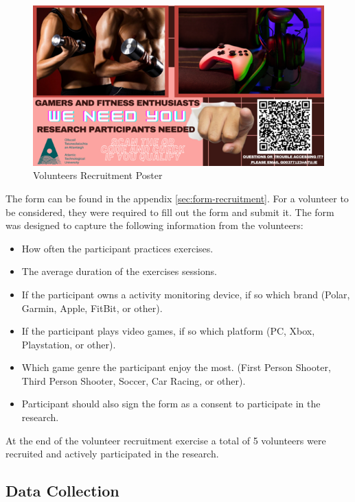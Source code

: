 \begin{figure}[ht]
    \centering
    \includegraphics[width=0.95\linewidth]{images/poster.png}
    \caption{Volunteers Recruitment Poster}
    \label{fig:recruitment-poster}
\end{figure}

The form can be found in the appendix \ref{sec:form-recruitment}.
For a volunteer to be considered, they were required to fill out the form and submit it. The form was designed to capture the following information from the volunteers:

\begin{itemize}
    \item How often the participant practices exercises.
    \item The average duration of the exercises sessions.
    \item If the participant owns a activity monitoring device, if so which brand (Polar, Garmin, Apple, FitBit, or other).
    \item If the participant plays video games, if so which platform (PC, Xbox, Playstation, or other).
    \item Which game genre the participant enjoy the most. (First Person Shooter, Third Person Shooter, Soccer, Car Racing, or other).
    \item Participant should also sign the form as a consent to participate in the research.
\end{itemize}

At the end of the volunteer recruitment exercise a total of 5 volunteers were recruited and actively participated in the research. 

\subsection{Data Collection}

